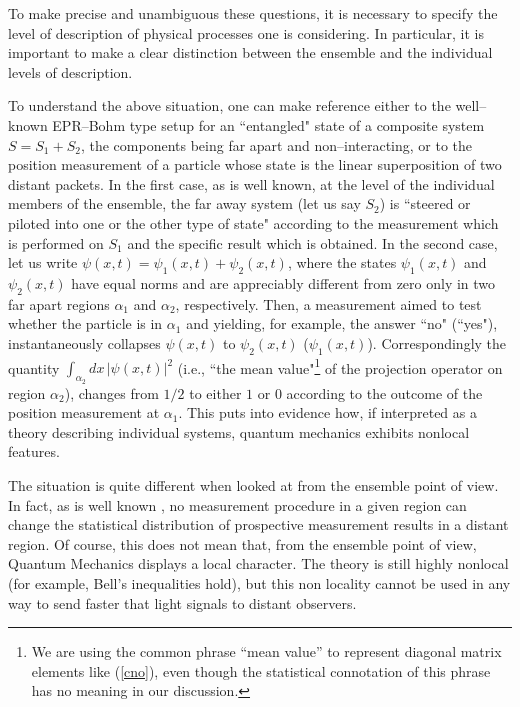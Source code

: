 \documentclass[10pt,a4paper]{article}
\begin{document}
To make precise and unambiguous these questions, it is necessary
to specify the level of description of physical processes one is
considering. In particular, it is important to make a clear
distinction between the ensemble and the individual levels of
description.

To understand the above situation, one can make reference either
to the well--known EPR--Bohm type setup for an ``entangled" state
of a composite system $S = S_{1}+ S_{2}$, the components being far
apart and non--interacting, or to the position measurement of a
particle whose state is the linear superposition of two distant
packets. In the first case, as is well known, at the level of the
individual members of the ensemble, the far away system (let us
say $S_{2}$) is \cite{sche} ``steered or piloted into one or the
other type of state" according to the measurement which is
performed on $S_{1}$ and the specific result which is obtained. In
the second case, let us write $\psi (x, t) = \psi_{1}(x, t) +
\psi_{2}(x, t)$, where the states $\psi_{1}(x, t)$ and
$\psi_{2}(x, t)$ have equal norms and are appreciably different
from zero only in two far apart regions $\alpha_{1}$ and
$\alpha_{2}$, respectively. Then, a measurement aimed to test
whether the particle is in $\alpha_{1}$ and yielding, for example,
the answer ``no" (``yes"), instantaneously collapses $\psi (x, t)$
to $\psi_{2}(x, t)$ ($\psi_{1}(x, t)$). Correspondingly the
quantity $\int_{\alpha_{2}} dx\, |\psi (x, t)|^{2}$ (i.e., ``the
mean value"\footnote{We are using the common phrase ``mean value''
to represent diagonal matrix elements like (\ref{cno}), even
though the statistical connotation of this phrase has no meaning
in our discussion.} of the projection operator on region
$\alpha_{2}$), changes from $1/2$ to either $1$ or $0$ according
to the outcome of the position measurement at $\alpha_{1}$. This
puts into evidence how, if interpreted as a theory describing
individual systems, quantum mechanics exhibits nonlocal features.

The situation is quite different when looked at from the ensemble
point of view. In fact, as is well known
\cite{heb,grwfl,gwfl,shi1}, no measurement procedure in a given
region can change the statistical distribution of prospective
measurement results in a distant region. Of course, this does not
mean that, from the ensemble point of view, Quantum Mechanics
displays a local character. The theory is still highly nonlocal
(for example, Bell's inequalities hold), but this non locality
cannot be used in any way to send faster that light signals to
distant observers.
\end{document}
